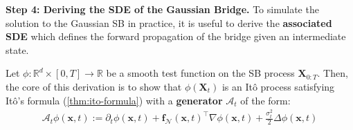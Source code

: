 \documentclass{article}
\begin{document}
\textbf{Step 4: Deriving the SDE of the Gaussian Bridge. }
To simulate the solution to the Gaussian SB in practice, it is useful to derive the \textbf{associated SDE} which defines the forward propagation of the bridge given an intermediate state. 

Let $\phi: \mathbb{R}^d\times [0,T]\to \mathbb{R}$ be a smooth test function on the SB process $\boldsymbol{X}_{0:T}$. Then, the core of this derivation is to show that $\phi(\boldsymbol{X}_t)$ is an Itô process satisfying Itô's formula (\ref{thm:ito-formula}) with a \textbf{generator} $\mathcal{A}_t$ of the form:
\begin{align}
    \mathcal{A}_t\phi(\boldsymbol{x},t):=\partial_t\phi(\boldsymbol{x},t)+\boldsymbol{f}_{\mathcal{N}}(\boldsymbol{x},t)^\top\nabla \phi(\boldsymbol{x},t)+\frac{\sigma_t^2}{2}\Delta \phi(\boldsymbol{x},t)\label{eq:gaussian-sb-generator}
\end{align}
\end{document}
